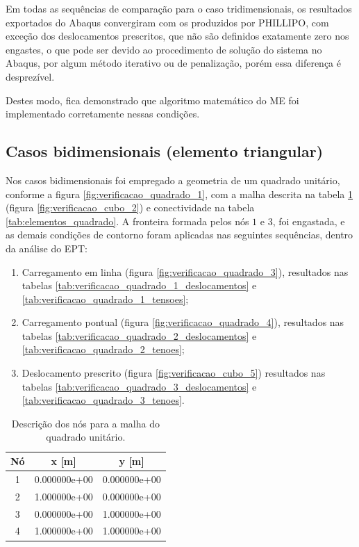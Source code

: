 Em todas as sequências de comparação para o caso tridimensionais, os resultados exportados do Abaqus convergiram com os produzidos por PHILLIPO, com exceção dos deslocamentos prescritos, que não são definidos exatamente zero nos engastes, o que pode ser devido ao procedimento de solução do sistema no Abaqus, por algum método iterativo ou de penalização, porém essa diferença é desprezível.

Destes modo, fica demonstrado que algoritmo matemático do ME foi implementado corretamente nessas condições. 

\subsection{Casos bidimensionais (elemento triangular)}

Nos casos bidimensionais foi empregado a geometria de um quadrado unitário, conforme a figura \ref{fig:verificacao_quadrado_1}, com a malha descrita na tabela \ref{tab:nos_quadrado} (figura \ref{fig:verificacao_cubo_2}) e conectividade na tabela \ref{tab:elementos_quadrado}. A fronteira formada pelos nós $1$ e $3$, foi engastada, e as demais condições de contorno foram aplicadas nas seguintes sequências, dentro da análise do EPT:

\begin{enumerate}
    \item Carregamento em linha (figura \ref{fig:verificacao_quadrado_3}), resultados nas tabelas \ref{tab:verificacao_quadrado_1_deslocamentos} e \ref{tab:verificacao_quadrado_1_tensoes};
    \item Carregamento pontual (figura \ref{fig:verificacao_quadrado_4}), resultados nas tabelas \ref{tab:verificacao_quadrado_2_deslocamentos} e \ref{tab:verificacao_quadrado_2_tenoes};
    \item Deslocamento prescrito (figura \ref{fig:verificacao_cubo_5}) resultados nas tabelas \ref{tab:verificacao_quadrado_3_deslocamentos} e \ref{tab:verificacao_quadrado_3_tenoes}.
\end{enumerate}

\begin{table}
    \centering
    \caption{Descrição dos nós para a malha do quadrado unitário.}
    \begin{tabular}{c | c c}
        \toprule
        \textbf{Nó} & \textbf{x} [m]  & \textbf{y}  [m] \\
        \midrule
        1 & 0.000000e+00 & 0.000000e+00 \\
        2 & 1.000000e+00 & 0.000000e+00 \\
        3 & 0.000000e+00 & 1.000000e+00 \\
        4 & 1.000000e+00 & 1.000000e+00 \\
        \bottomrule
    \end{tabular}
    \label{tab:nos_quadrado}
\end{table}

